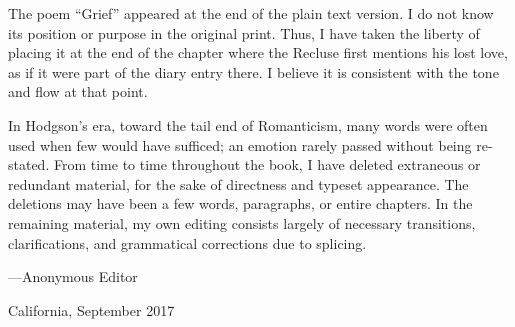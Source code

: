 \documentclass{novel} %
\begin{document}
The poem “Grief” appeared at the end of the plain text version. I do not know its position or purpose in the original print. Thus, I have taken the liberty of placing it at the end of the chapter where the Recluse first mentions his lost love, as if it were part of the diary entry there. I believe it is consistent with the tone and flow at that point.\par
In Hodgson’s era, toward the tail end of Romanticism, many words were often used when few would have sufficed; an emotion rarely passed without being re-stated. From time to time throughout the book, I have deleted extraneous or redundant material, for the sake of directness and typeset appearance. The deletions may have been a few words, paragraphs, or entire chapters. In the remaining material, my own editing consists largely of necessary transitions, clarifications, and grammatical corrections due to splicing.\par
\null
\stake\hfill---Anonymous Editor\par
\stake\hfill California, September 2017\par
\thispagestyle{empty} %
\cleartorecto
\end{document}
